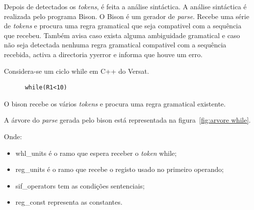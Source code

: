 

Depois de detectados os {\it tokens}, é feita a análise sintáctica. A análise sintáctica é realizada pelo programa Bison.
O Bison é um gerador de {\it parse}. Recebe uma série de {\it tokens} e procura uma regra gramatical que seja compativel com a sequência que recebeu. Também
avisa caso exista alguma ambiguidade gramatical e caso não seja detectada nenhuma regra gramatical compativel com a sequência recebida, activa a directoria
yyerror e informa que houve um erro.

Considera-se um ciclo while em C++ do Versat.

\begin{lstlisting} 
      while(R1<10)      
\end{lstlisting}  

O bison recebe os vários {\it tokens} e procura uma regra gramatical existente. 


A árvore do {\it parse} gerada pelo bison está representada na figura~\ref{fig:arvore while}.

Onde:

\begin{itemize}
  \item whl\_units é o ramo que espera receber o {\it token} while;
  \item reg\_units é o ramo que recebe o registo usado no primeiro operando;
  \item sif\_operators tem as condições sentenciais;
  \item reg\_const representa as constantes.
\end{itemize}


\pagebreak

